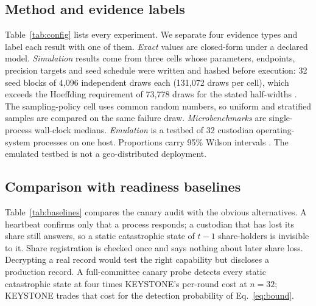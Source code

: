 \documentclass[10pt]{article}
\begin{document}
\subsection{Method and evidence labels}

Table~\ref{tab:config} lists every experiment. We separate four evidence types and label each result with one of them. \emph{Exact} values are closed-form under a declared model. \emph{Simulation} results come from three cells whose parameters, endpoints, precision targets and seed schedule were written and hashed before execution: 32 seed blocks of 4{,}096 independent draws each (131{,}072 draws per cell), which exceeds the Hoeffding requirement of 73{,}778 draws for the stated half-widths \citep{hoeffding1963}. The sampling-policy cell uses common random numbers, so uniform and stratified samples are compared on the same failure draw. \emph{Microbenchmarks} are single-process wall-clock medians. \emph{Emulation} is a testbed of 32 custodian operating-system processes on one host. Proportions carry 95\% Wilson intervals \citep{wilson1927}. The emulated testbed is not a geo-distributed deployment.

\begin{table}[!htbp]
\centering
\caption{Experimental configuration. The baseline committee is $n=32$, $t=22$, $s=q=8$ with four failure domains of eight custodians.}
\label{tab:config}
\small

\end{table}

\subsection{Comparison with readiness baselines}

Table~\ref{tab:baselines} compares the canary audit with the obvious alternatives. A heartbeat confirms only that a process responds; a custodian that has lost its share still answers, so a static catastrophic state of $t-1$ share-holders is invisible to it. Share registration is checked once and says nothing about later share loss. Decrypting a real record would test the right capability but discloses a production record. A full-committee canary probe detects every static catastrophic state at four times KEYSTONE's per-round cost at $n=32$; KEYSTONE trades that cost for the detection probability of Eq.~\eqref{eq:bound}.

\begin{table}[!htbp]
\centering
\caption{Readiness checks compared. Costs are measured medians for ffdhe2048 in the prototype (Table~\ref{tab:operations}); bytes are canonical request plus response transcripts.}
\label{tab:baselines}
\small

\end{table}
\end{document}
